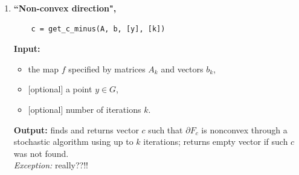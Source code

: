 \documentclass[a4paper]{article}
\newcommand{\R}{\mathbb{R}}
\theoremstyle{definition}
\begin{document}
\begin{enumerate}
%
%
%
%

\item {\bf ``Non-convex direction",\hskip 6pt} 
	\begin{verbatim}
	c = get_c_minus(A, b, [y], [k])
	\end{verbatim}
{\bf Input:}
\begin{itemize}
	\item the map $f$ specified by matrices $A_k$ and vectors $b_k$,
	\item  $[$optional$]$ a point $y\in G$,
	\item $[$optional$]$ number of iterations $k$.
\end{itemize}
{\bf Output:}  finds and returns vector $c$ such that $\partial F_c$ is nonconvex through a stochastic algorithm using up to $k$ iterations; returns empty vector if such $c$ was not  found.\\
{\it Exception:} really??!!


\end{enumerate}
\end{document}
